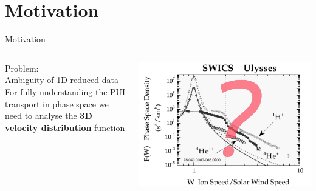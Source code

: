 \documentclass{beamer}
\begin{document}
\section{Motivation}
\begin{frame}{Motivation}
\begin{columns}
	\column[]{5cm}
	Problem: \\ Ambiguity of 1D reduced data
	\\[1cm]
	For fully understanding the PUI transport in phase space we need to analyse the \textbf{3D velocity distribution} function
	
	\column[]{5cm}
	\includegraphics[scale=0.18]{Pics/qm.pdf}
\end{columns}

\end{frame}

\end{document}
